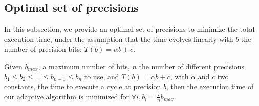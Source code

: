 \subsection{Optimal set of precisions}

In this subsection, we provide an optimal set of precisions to minimize the
total execution time, under the assumption that the time evolves linearly with
$b$ the number of precision bits: $T(b) = \alpha b + c$. 

   \begin{theorem}

       Given $b_{max}$, a maximum number of bits, $n$ the number of different
       precisions $b_1 \leq b_2 \leq \dots \leq b_{n-1} \leq b_n$ to use, and $T(b)=\alpha b+c$, with $\alpha$
       and $c$ two constants, the time to execute a cycle at precision $b$,
       then the execution time of our adaptive algorithm is minimized for $\forall i, b_i
       = \frac{i}{n}b_{max}$.

   \end{theorem}

